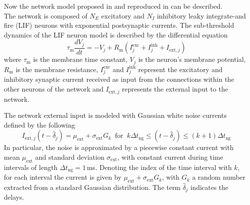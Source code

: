 \documentclass[a4paper, 12pt, twoside, openright]{book}
\begin{document}
Now the network model proposed in \cite{Mongillo2008} and reproduced in \cite{Tiddia2022_WM} can be described.\\
The network is composed of $N_E$ excitatory and $N_I$ inhibitory leaky integrate-and fire (LIF) neurons with exponential postsynaptic currents. The sub-threshold dynamics of the LIF neuron model is described by the differential equation
\begin{equation}
    \tau_{\text{m}} \frac{dV_{j}}{dt}=-V_{j} + R_{\text{m}} ( I_{j}^{\text{exc}}+I_{j}^{\text{inh}} + I_{\text{ext},j})
    \label{eq:lif_wm}
\end{equation}
where $\tau_{\text{m}}$ is the membrane time constant, $V_{j}$ is the neuron's membrane potential, $R_{\text{m}}$ is the membrane resistance, $I_{j}^{\text{exc}}$ and $I_{j}^{\text{inh}}$ represent the excitatory and inhibitory synaptic current received as input from the connections within the other neurons of the network and $I_{\text{ext},j}$ represents the external input to the network. 

The network external input is modeled with Gaussian white noise currents defined by the following
\begin{equation}
    I_{\text{ext},j}(t-\hat{\delta}_{j}) = \mu_{\text{ext}}+\sigma_{\text{ext}}G_k \ \text{  for } \ k\Delta t_{\text{ng}} \leq (t-\hat{\delta}_{j}) \leq (k+1)\Delta t_{\text{ng}}
    \label{eq:gaussian_white_noise}
\end{equation}
In particular, the noise is approximated by a piecewise constant current with mean $\mu_{\text{ext}}$ and standard deviation $\sigma_{\text{ext}}$, with constant current during time intervals of length $\Delta t_{\text{ng}} = 1$\,ms. Denoting the index of the time interval with $k$, for each interval the current is given by $\mu_{\text{ext}}+\sigma_{\text{ext}}G_k$, with $G_k$ a random number extracted from a standard Gaussian distribution. The term $\hat{\delta}_{j}$ indicates the delays.
\end{document}
